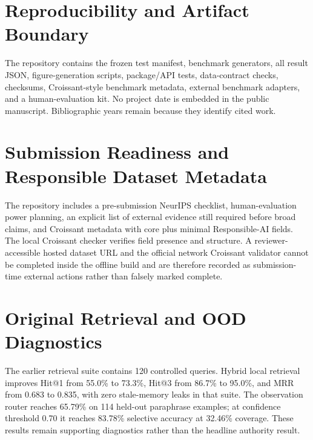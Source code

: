 \documentclass[10pt]{article}
\begin{document}
\appendix
\section{Reproducibility and Artifact Boundary}
The repository contains the frozen test manifest, benchmark generators, all result JSON, figure-generation scripts, package/API tests, data-contract checks, checksums, Croissant-style benchmark metadata, external benchmark adapters, and a human-evaluation kit. No project date is embedded in the public manuscript. Bibliographic years remain because they identify cited work.


\section{Submission Readiness and Responsible Dataset Metadata}
The repository includes a pre-submission NeurIPS checklist, human-evaluation power planning, an explicit list of external evidence still required before broad claims, and Croissant metadata with core plus minimal Responsible-AI fields. The local Croissant checker verifies field presence and structure. A reviewer-accessible hosted dataset URL and the official network Croissant validator cannot be completed inside the offline build and are therefore recorded as submission-time external actions rather than falsely marked complete.

\section{Original Retrieval and OOD Diagnostics}
The earlier retrieval suite contains 120 controlled queries. Hybrid local retrieval improves Hit@1 from 55.0\% to 73.3\%, Hit@3 from 86.7\% to 95.0\%, and MRR from 0.683 to 0.835, with zero stale-memory leaks in that suite. The observation router reaches 65.79\% on 114 held-out paraphrase examples; at confidence threshold 0.70 it reaches 83.78\% selective accuracy at 32.46\% coverage. These results remain supporting diagnostics rather than the headline authority result.
\end{document}
